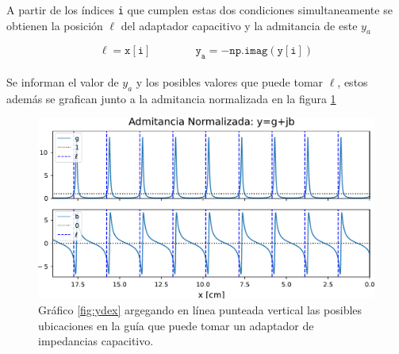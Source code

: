 \documentclass[11pt,a4paper]{article}
\begin{document}
\begin{appendices}
\begin{multicols}{2}
    A partir de los índices \texttt{i} que cumplen estas dos condiciones simultaneamente se obtienen la posición $\ell$ del adaptador capacitivo y la admitancia de este $y_a$ 
    
    \begin{equation}
        \mathtt{\ell = x[i]\qquad\qquad y_a = - np.imag(y[i])}
    \end{equation}\\[-1em]

    Se informan el valor de $y_a$ y los posibles valores que puede tomar $\ell$, estos además se grafican junto a la admitancia normalizada en la figura \ref{fig:ydex_l}\\

    \begin{figure}[H]
        \centering
        \includegraphics[width=\linewidth]{Images/ydex_l.pdf}
        \caption{Gráfico \ref{fig:ydex} argegando en línea punteada vertical las posibles ubicaciones en la guía que puede tomar un adaptador de impedancias capacitivo.}
        \label{fig:ydex_l}
    \end{figure}

\end{multicols}
\pagebreak

\end{appendices}


\begin{multicols}{2}

\end{multicols}
\end{document}
